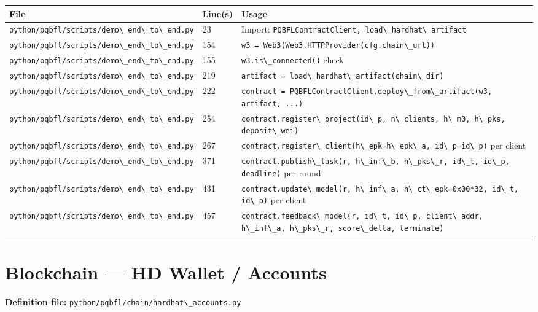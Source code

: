\documentclass[11pt,a4paper]{article}
\newcommand{\code}[1]{\lstinline[basicstyle=\ttfamily\small]!#1!}
\begin{document}
\begin{longtable}{L{5.5cm} L{1.8cm} L{7cm}}
\toprule
\textbf{File} & \textbf{Line(s)} & \textbf{Usage} \\
\midrule
\endhead
\bottomrule
\endfoot
\code{python/pqbfl/scripts/demo\_end\_to\_end.py} & 23      & Import: \code{PQBFLContractClient, load\_hardhat\_artifact} \\
\code{python/pqbfl/scripts/demo\_end\_to\_end.py} & 154     & \code{w3 = Web3(Web3.HTTPProvider(cfg.chain\_url))} \\
\code{python/pqbfl/scripts/demo\_end\_to\_end.py} & 155     & \code{w3.is\_connected()} check \\
\code{python/pqbfl/scripts/demo\_end\_to\_end.py} & 219     & \code{artifact = load\_hardhat\_artifact(chain\_dir)} \\
\code{python/pqbfl/scripts/demo\_end\_to\_end.py} & 222     & \code{contract = PQBFLContractClient.deploy\_from\_artifact(w3, artifact, ...)} \\
\code{python/pqbfl/scripts/demo\_end\_to\_end.py} & 254     & \code{contract.register\_project(id\_p, n\_clients, h\_m0, h\_pks, deposit\_wei)} \\
\code{python/pqbfl/scripts/demo\_end\_to\_end.py} & 267     & \code{contract.register\_client(h\_epk=h\_epk\_a, id\_p=id\_p)} per client \\
\code{python/pqbfl/scripts/demo\_end\_to\_end.py} & 371     & \code{contract.publish\_task(r, h\_inf\_b, h\_pks\_r, id\_t, id\_p, deadline)} per round \\
\code{python/pqbfl/scripts/demo\_end\_to\_end.py} & 431     & \code{contract.update\_model(r, h\_inf\_a, h\_ct\_epk=0x00*32, id\_t, id\_p)} per client \\
\code{python/pqbfl/scripts/demo\_end\_to\_end.py} & 457     & \code{contract.feedback\_model(r, id\_t, id\_p, client\_addr, h\_inf\_a, h\_pks\_r, score\_delta, terminate)} \\
\end{longtable}

\section{Blockchain --- HD Wallet / Accounts}

\textbf{Definition file:} \code{python/pqbfl/chain/hardhat\_accounts.py}
\end{document}
